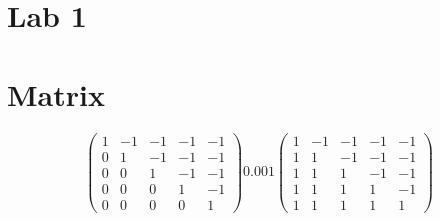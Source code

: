 \documentclass{article}%
\begin{document}
%
\normalsize%
\section{Lab 1}%
\label{sec:Lab1}%
\section{Matrix}%
\label{sec:Matrix}%
\[%
\begin{pmatrix}%
1&-1&-1&-1&-1\\%
0&1&-1&-1&-1\\%
0&0&1&-1&-1\\%
0&0&0&1&-1\\%
0&0&0&0&1%
\end{pmatrix} 0.001 \begin{pmatrix}%
1&-1&-1&-1&-1\\%
1&1&-1&-1&-1\\%
1&1&1&-1&-1\\%
1&1&1&1&-1\\%
1&1&1&1&1%
\end{pmatrix}
\]

%
\end{document}
